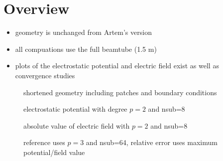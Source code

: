 \section{Overview}
\begin{itemize}
  \item geometry is unchanged from Artem's version
  \item all compuations use the full beamtube (1.5 m)
  \item plots of the electrostatic potential and electric field exist as well as convergence studies
\end{itemize}

\begin{center}
\begin{figure}[H]
  
  \caption{shortened geometry including patches and boundary conditions}
\end{figure}
\end{center}

\begin{center}
\begin{figure}[p]
  
  \caption{electrostatic potential with degree $p=2$ and nsub=8}
\end{figure}
\end{center}

\begin{center}
\begin{figure}[p]
  
  \caption{absolute value of electric field with $p=2$ and nsub=8}
\end{figure}
\end{center}

\begin{figure}[H]
  \hspace{-2.5cm}
  
  \caption{reference uses $p=3$ and nsub=64, relative error uses maximum potential/field value}
\end{figure}
